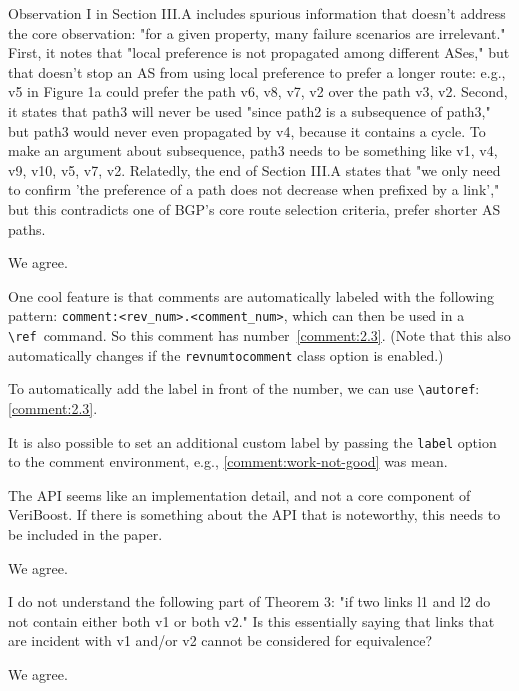 \begin{revcomment}
Observation I in Section III.A includes spurious information that doesn't address the core observation: 
"for a given property, many failure scenarios are irrelevant." 
First, it notes that "local preference is not propagated among different ASes," 
but that doesn't stop an AS from using local preference to prefer a longer route: e.g., v5 in Figure 1a could prefer the path v6, v8, v7, v2 over the path v3, v2. 
Second, it states that path3 will never be used "since path2 is a subsequence of path3," but path3 would never even propagated by v4, 
because it contains a cycle. To make an argument about subsequence, path3 needs to be something like v1, v4, v9, v10, v5, v7, v2. Relatedly, 
the end of Section III.A states that "we only need to confirm 'the preference of a path does not decrease when prefixed by a link'," 
but this contradicts one of BGP's core route selection criteria, prefer shorter AS paths.
\end{revcomment}
\begin{revresponse}
	We agree.

	One cool feature is that comments are automatically labeled with the following pattern:\newline
	\verb|comment:<rev_num>.<comment_num>|, which can then be used in a \verb|\ref|~command.
	So this comment has number~\ref{comment:2.3}.
	(Note that this also automatically changes if the \texttt{revnumtocomment} class option is enabled.)

	To automatically add the label in front of the number, we can use \verb|\autoref|: \autoref{comment:2.3}.

	It is also possible to set an additional custom label by passing the \texttt{label} option to the comment environment, e.g., \autoref{comment:work-not-good} was mean.
\end{revresponse}

\begin{revcomment}
The API seems like an implementation detail, and not a core component of VeriBoost. 
If there is something about the API that is noteworthy, 
this needs to be included in the paper.
\end{revcomment}
\begin{revresponse}
	We agree.
\end{revresponse}

\begin{revcomment}
I do not understand the following part of Theorem 3: "if two links l1 and l2 do not contain either both v1 or both v2." 
Is this essentially saying that links that are incident with v1 and/or v2 cannot be considered for equivalence?
\end{revcomment}
\begin{revresponse}
	We agree.
\end{revresponse}


